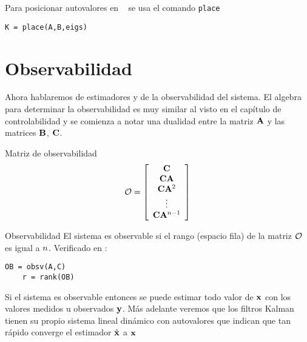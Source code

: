 \documentclass[11pt, a4paper, twoside, openright, openany]{book}
\newcommand{\dimss}{\dimfont{n}}
\begin{document}
Para posicionar autovalores en \Matlab~ se usa el comando \texttt{place}

\begin{lstlisting}[caption={Posicionamiento de autovalores en las posiciones \texttt{eigs} deseadas.}]
K = place(A,B,eigs)
\end{lstlisting}

\chapter{Observabilidad}
Ahora hablaremos de estimadores y de la observabilidad del sistema. El algebra para determinar la observabilidad es muy similar al visto en el capítulo de controlabilidad y se comienza a notar una dualidad entre la matriz $\mathbf{A}$ y las matrices $\mathbf{B}$, $\mathbf{C}$.

\begin{definition}{Matriz de observabilidad}
\[
\mathbf{\mathcal{O}} =  \left[\begin{array}{c}
\mathbf{C} \\ \mathbf{C} \mathbf{A} \\ \mathbf{C} \mathbf{A}^2 \\ \vdots \\ \mathbf{C} \mathbf{A}^{n-1}
\end{array}\right]
\]
\end{definition}
\begin{definition}{Observabilidad}
	El sistema es observable si el rango (espacio fila) de la matriz $\mathbf{\mathcal{O}}$ es igual a $\dimss$. Verificado en \Matlab:
	\begin{lstlisting}[caption={Como calcular $\obsv$ y su rango en \Matlab}]
	OB = obsv(A,C)
	r = rank(OB)
	\end{lstlisting}
\end{definition}

Si el sistema es observable entonces se puede estimar todo valor de $\mathbf{x}$ con los valores medidos u observados $\mathbf{y}$. Más adelante veremos que los filtros Kalman tienen su propio sistema lineal dinámico con autovalores que indican que tan rápido converge el estimador $\hat{\mathbf{x}}$ a $\mathbf{x}$
\end{document}
